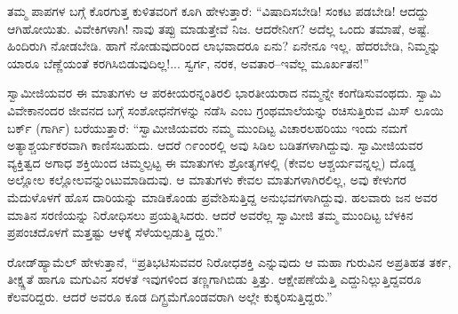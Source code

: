 ತಮ್ಮ ಪಾಪಗಳ ಬಗ್ಗೆ ಕೊರಗುತ್ತ ಕುಳಿತವರಿಗೆ ಕೂಗಿ ಹೇಳುತ್ತಾರೆ: “ವಿಷಾದಿಸಬೇಡಿ! ಸಂಕಟ ಪಡಬೇಡಿ! ಆದದ್ದು ಆಗಿಹೋಯಿತು. ವಿವೇಕಿಗಳಾಗಿ! ನಾವು ತಪ್ಪು ಮಾಡುತ್ತೇವೆ ನಿಜ. ಆದರೇನೀಗ? ಅದೆಲ್ಲ ಒಂದು ತಮಾಷೆ, ಅಷ್ಟೆ. ಹಿಂದಿರುಗಿ ನೋಡಬೇಡಿ. ಹಾಗೆ ನೋಡುವುದರಿಂದ ಲಾಭವಾದರೂ ಏನು? ಏನೇನೂ ಇಲ್ಲ. ಹೆದರಬೇಡಿ, ನಿಮ್ಮನ್ನು ಯಾರೂ ಬೆಣ್ಣೆಯಂತೆ ಕರಗಿಸಿಬಿಡುವುದಿಲ್ಲ!... ಸ್ವರ್ಗ, ನರಕ, ಅವತಾರ–ಇವೆಲ್ಲ ಮೂರ್ಖತನ!”

ಸ್ವಾಮೀಜಿಯವರ ಈ ಮಾತುಗಳು ಆ ಪರಕೀಯರನ್ನಂತಿರಲಿ ಭಾರತೀಯರಾದ ನಮ್ಮನ್ನೇ ಕಂಗೆಡಿಸುವಂಥದು. ಸ್ವಾಮಿ ವಿವೇಕಾನಂದರ ಜೀವನದ ಬಗ್ಗೆ ಸಂಶೋಧನೆಗಳನ್ನು ನಡೆಸಿ  ಎಂಬ ಗ್ರಂಥಮಾಲೆಯನ್ನು ರಚಿಸುತ್ತಿರುವ ಮಿಸ್ ಲೂಯಿ ಬರ್ಕ್ (ಗಾರ್ಗಿ) ಬರೆಯುತ್ತಾರೆ: “ಸ್ವಾಮೀಜಿಯವರು ನಮ್ಮ ಮುಂದಿಟ್ಟ ವಿಚಾರಲಹರಿಯು ಇಂದು ನಮಗೆ ಅತ್ಯಾಶ್ಚರ್ಯಕರವಾಗಿ ಕಾಣಿಸಬಹುದು. ಆದರೆ ೧೯ಂಂರಲ್ಲಿ ಅವು ಸಿಡಿಲ ಬಡಿತಗಳಾಗಿದ್ದುವು. ಸ್ವಾಮೀಜಿಯವರ ವ್ಯಕ್ತಿತ್ವದ ಅಗಾಧ ಶಕ್ತಿಯಿಂದ ಚಿಮ್ಮಲ್ಪಟ್ಟ ಈ ಮಾತುಗಳು ಶ್ರೋತೃಗಳಲ್ಲಿ (ಕೇವಲ ಆಶ್ಚರ್ಯವನ್ನಲ್ಲ) ದೊಡ್ಡ ಅಲ್ಲೋಲ ಕಲ್ಲೋಲವನ್ನುಂಟುಮಾಡಿದುವು. ಆ ಮಾತುಗಳು ಕೇವಲ ಮಾತುಗಳಾಗಿರಲಿಲ್ಲ, ಅವು ಕೇಳುಗರ ಮೆದುಳೊಳಗೆ ಹೊಸ ದಾರಿಯನ್ನು ಮಾಡಿಕೊಂಡು ಪ್ರವೇಶಿಸುತ್ತಿದ್ದ ಅನುಭವಗಳಾಗಿದ್ದುವು. ಹಲವಾರು ಜನ ಅವರ ಮಾತಿನ ಸರಣಿಯನ್ನು ನಿರೋಧಿಸಲು ಪ್ರಯತ್ನಿಸಿದರು. ಆದರೆ ಅವರೆಲ್ಲ ಸ್ವಾಮೀಜಿ ತಮ್ಮ ಮುಂದಿಟ್ಟ ಬೆಳಕಿನ ಪ್ರಪಂಚದೊಳಗೆ ಮತ್ತಷ್ಟು ಆಳಕ್ಕೆ ಸೆಳೆಯಲ್ಪಡುತ್ತಿ ದ್ದರು.”

ರೋಡ್​ಹ್ಯಾಮೆಲ್ ಹೇಳುತ್ತಾನೆ, “ಪ್ರತಿಭಟಿಸುವವರ ನಿರೋಧಶಕ್ತಿ ಎನ್ನುವುದು ಆ ಮಹಾ ಗುರುವಿನ ಅಪ್ರತಿಹತ ತರ್ಕ, ತೀಕ್ಷ್ಣತೆ ಹಾಗೂ ಮಗುವಿನ ಸರಳತೆ ಇವುಗಳಿಂದ ತಣ್ಣಗಾಗಿಬಿಡು ತ್ತಿತ್ತು. ಆಕ್ಷೇಪಣೆಯೆತ್ತಿ ಎದ್ದುನಿಲ್ಲುತ್ತಿದ್ದವರೂ ಕೆಲವರಿದ್ದರು. ಆದರೆ ಅವರೂ ಕೂಡ ದಿಗ್ಬ್ರಮೆಗೊಂಡವರಾಗಿ ಅಲ್ಲೇ ಕುಕ್ಕರಿಸುತ್ತಿದ್ದರು.”

